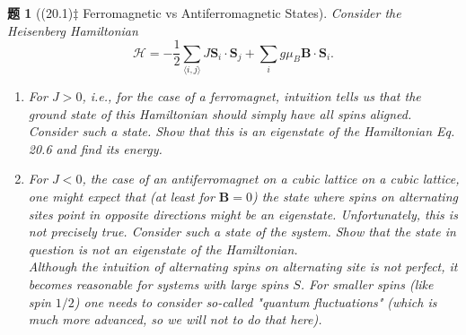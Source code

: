 \documentclass[UTF8,10pt,a4paper]{article}
\theoremstyle{Problem}
\newtheorem{prob}{题}
\theoremstyle{Solution}
\begin{document}
\begin{prob}[(20.1)$\ddagger$ Ferromagnetic vs Antiferromagnetic States]
    Consider the Heisenberg Hamiltonian
    \[
        \mathcal{H}=-\frac{1}{2}\sum_{\langle i,j\rangle}J\bm{S}_i\cdot\bm{S}_j+\sum_ig\mu_{B}\bm{B}\cdot\bm{S}_i.\tag{20.6}
    \]
    \begin{enumerate}
        \item[(a)] For $J>0$, i.e., for the case of a ferromagnet, intuition tells us that the ground state of this Hamiltonian should simply have all spins aligned. Consider such a state. Show that this is an eigenstate of the Hamiltonian Eq. 20.6 and find its energy.
        \item[(b)] For $J<0$, the case of an antiferromagnet on a cubic lattice on a cubic lattice, one might expect that (at least for $\bm{B}=0$) the state where spins on alternating sites point in opposite directions might be an eigenstate. Unfortunately, this is not precisely true. Consider such a state of the system. Show that the state in question is not an eigenstate of the Hamiltonian.\\
        Although the intuition of alternating spins on alternating site is not perfect, it becomes reasonable for systems with large spins $S$. For smaller spins (like spin $1/2$) one needs to consider so-called "quantum fluctuations" (which is much more advanced, so we will not to do that here).
    \end{enumerate}
\end{prob}
\end{document}
